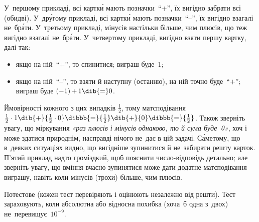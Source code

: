 \noindent
\begin{exampleSimple}{16em}{5em}
%
%
%
%
%
\end{exampleSimple}

\Notes
У~першому прикладі, всі картк\'{и} мають позначки~\mbox{``+''}, їх вигідно забрати всі (обидві).
У~др\'{у}гому прикладі, всі картк\'{и} мають позначки~\mbox{``–''}, їх вигідно взагалі не~бр\'{а}ти.
У~третьому прикладі, мінусів настільки більше, чим плюсів, що теж вигідно взагалі не~бр\'{а}ти.
У~четвертому прикладі, вигідно взяти першу картку, далі так:
\begin{itemize}
\item
якщо на ній~``$+$'', то спинитися; виграш буде~1;
\item
якщо на ній~``$–$'', то взяти й наступну (останню), на ній точно буде~``$+$''; виграш буде ${({-}1)\,{+}\,1}\dib{{=}}0$.
\end{itemize}
Ймовірності кожного з цих випадків $\frac{1}{2}$, тому матсподівання %
$
{\frac{1}{2}\cdot1}\dib{{+}}
{\frac{1}{2}\cdot0}\dibbb{{=}}
{\frac{1}{2}}\dib{{+}}
{0}\dibbb{{=}}
{\frac{1}{2}}
$.
Також зверніть увагу, що міркування \textsl{«раз плюсів і мінусів однаково, то й сума буде~0»}, хоч і може здатися природнім, насправді нічого не~дає в цій задачі. \mbox{С\'{а}ме}\nolinebreak[3] тому, що в~деяких ситуаціях видно, що вигідніше зупинитися й не~забирати решту карток.
П'ятий приклад надто громіздкий, щоб пояснити число-відповідь детально; але зверніть увагу, що вміння вчасно зупинятися може дати додатне матсподівання виграшу, навіть коли мінусів (трохи) більше, чим плюсів.

\Scoring
Потестове (кожен тест перевіряють і оцінюють неза\-леж\-но від решти).
Тест зараховують, коли абсолютна або відносна похибка (хоча~б одна з~двох) не~перевищує~$10^{-9}$.

